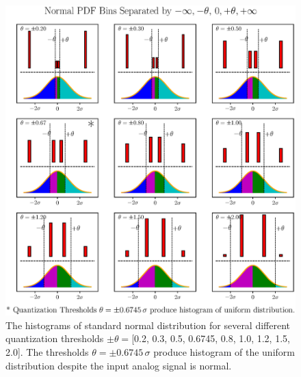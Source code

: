 \documentclass[letterpaper,twoside,12pt]{article}
\begin{document}
\begin{figure}[ht!]
  \begin{center}
  \includegraphics[width=40pc]{fig_various_bin_size_histograms.eps}
  \caption{\small The histograms of standard normal distribution for several different quantization thresholds $\pm\theta = $[0.2, 0.3, 0.5, 0.6745, 0.8, 1.0, 1.2, 1.5, 2.0]. The thresholds $\theta = \pm 0.6745 \, \sigma$ produce histogram of the uniform distribution despite the input analog signal is normal.}
  \label{var_bins_hists}
  \end{center}
\end{figure}
\end{document}
